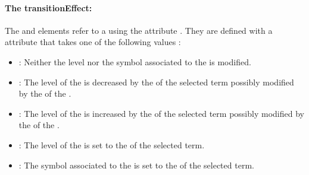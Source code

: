 \paragraph{The transitionEffect:}
The \Input and  elements refer to a \QualitativeSpecies using the attribute . They are defined with a  attribute that takes one of the following values :
\begin{itemize}
	\item {}: Neither the level nor the symbol associated to the  is modified.
	\item {}: The level of the  is decreased by the  of the selected term possibly modified by the  of the \Input.
	\item {}: The level of the  is increased by the  of the selected term possibly modified by the  of the .
	\item {}: The level of the  is set to the  of the selected term.
	\item {}: The symbol associated to the  is set to the  of the selected term.
\end{itemize}


